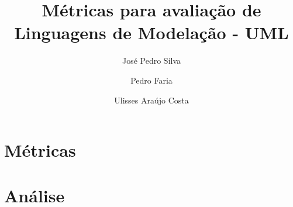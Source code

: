\documentclass[10pt]{article}
\title{\sf  Métricas para avaliação de Linguagens de Modelação - UML}
\author{ José Pedro Silva \and Pedro Faria \and Ulisses Araújo Costa }
\date{}
\begin{document}
\maketitle

\section{Métricas}

\section{Análise}


{}

\end{document}
